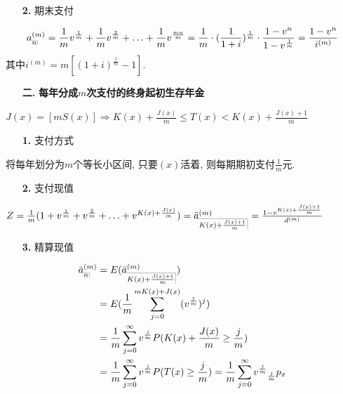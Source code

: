\documentclass[a4paper,10pt]{ctexbook}
\makeatletter
\newcommand{\hei}{\CJKfamily{hei}}      %
\DeclareRobustCommand{\annu}[1]{_{%
    \def\arraystretch{0}%
    \setlength\arraycolsep{1pt}%
    \setlength\arrayrulewidth{.2pt}%
    \begin{array}[b]{@{}c|}\hline
        \\[\arraycolsep]%
        \scriptstyle #1%
    \end{array}%
}}
\makeatother
\begin{document}
\begin{itemize}
    \item[{\bf\hei 2.}] 期末支付
\end{itemize}
\begin{align*}
    a_{\annu{n}}^{(m)} = \frac1m v^{\frac1m} + \frac1m v^{\frac2m} + \ldots + \frac1mv^{\frac{mn}m} = \frac1m \cdot (\frac{1}{1+i})^{\frac1m} \cdot \frac{1-v^n}{1-v^{\frac1m}} = \frac{1-v^n}{i^{(m)}}
\end{align*}
其中$i^{(m)} = m[(1+i)^{\frac1m}-1]$.

\begin{itemize}
    \item[{\bf\hei 二.}]{\bf\hei 每年分成$m$次支付的终身起初生存年金}
\end{itemize}

$J(x) = [mS(x)] \Rightarrow K(x) + \frac{J(x)}{m} \leq T(x) < K(x) + \frac{J(x)+1}{m}$

\begin{itemize}
    \item[{\bf\hei 1.}] 支付方式
\end{itemize}

将每年划分为$m$个等长小区间, 只要$(x)$活着, 则每期期初支付$\frac1m$元.

\begin{itemize}
    \item[{\bf\hei 2.}] 支付现值
\end{itemize}

$Z = \frac1m(1+v^{\frac1m} + v^{\frac2m} + \ldots + v^{K(x)+\frac{J(x)}{m}}) = \ddot a_{\annu{K(x)+\frac{J(x)+1}{m}}}^{(m)} = \frac{1-v^{K(x)+\frac{J(x)+1}{m}}}{d^{(m)}}$

\begin{itemize}
    \item[{\bf\hei 3.}] 精算现值
\end{itemize}
\begin{align*}
    \ddot{a}_{\annu{n}}^{(m)} & = E(\ddot a_{\annu{K(x)+\frac{J(x)+1}{m}}}^{(m)})                                                                             \\
                              & = E(\frac1m \sum_{j=0}^{mK(x)+J(x)} (v^\frac{1}m)^j)                                                                          \\
                              & = \frac1m \sum_{j=0}^{\infty} v^\frac{j}m P(K(x)+\frac{J(x)}m \geq \frac{j}{m})                                               \\
                              & = \frac1m \sum_{j=0}^{\infty} v^\frac{j}m P(T(x)\geq \frac{j}{m}) = \frac1m \sum_{j=0}^{\infty} v^\frac{j}m {}_{\frac{j}m}p_x
\end{align*}
\end{document}
